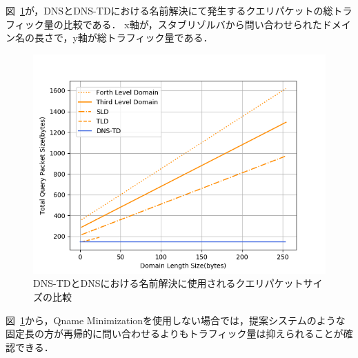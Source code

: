図~\ref{fig:length-size}が，DNSとDNS-TDにおける名前解決にて発生するクエリパケットの総トラフィック量の比較である．
x軸が，スタブリゾルバから問い合わせられたドメイン名の長さで，y軸が総トラフィック量である．

\begin{figure}[p]
 \centering
 \includegraphics[scale=0.8]{figure/length-size.png}
 \caption[DNSと提案システムのクエリパケットサイズ比較]{DNS-TDとDNSにおける名前解決に使用されるクエリパケットサイズの比較}
 \label{fig:length-size}
\end{figure}


図~\ref{fig:length-size}から，Qname Minimizationを使用しない場合では，提案システムのような固定長の方が再帰的に問い合わせるよりもトラフィック量は抑えられることが確認できる．

%


